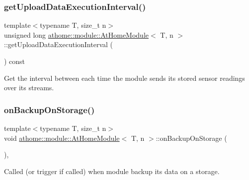 \subsubsection{\texorpdfstring{get\+Upload\+Data\+Execution\+Interval()}{getUploadDataExecutionInterval()}}
{\footnotesize\ttfamily template$<$typename T, size\+\_\+t n$>$ \\
unsigned long \mbox{\hyperlink{classathome_1_1module_1_1_at_home_module}{athome\+::module\+::\+At\+Home\+Module}}$<$ T, n $>$\+::get\+Upload\+Data\+Execution\+Interval (\begin{DoxyParamCaption}{ }\end{DoxyParamCaption}) const\hspace{0.3cm}{\ttfamily [inline]}}

Get the interval between each time the module sends its stored sensor readings over its streams. \mbox{\label{classathome_1_1module_1_1_at_home_module_aea6f4c8bdb27fa27915aa63185888f78}} 
\subsubsection{\texorpdfstring{on\+Backup\+On\+Storage()}{onBackupOnStorage()}}
{\footnotesize\ttfamily template$<$typename T, size\+\_\+t n$>$ \\
void \mbox{\hyperlink{classathome_1_1module_1_1_at_home_module}{athome\+::module\+::\+At\+Home\+Module}}$<$ T, n $>$\+::on\+Backup\+On\+Storage (\begin{DoxyParamCaption}{ }\end{DoxyParamCaption})\hspace{0.3cm}{\ttfamily [inline]}, {\ttfamily [protected]}}

Called (or trigger if called) when module backup its data on a storage. \mbox{\label{classathome_1_1module_1_1_at_home_module_ad8da3ff2774cee42f1d45cd12912c937}} 
